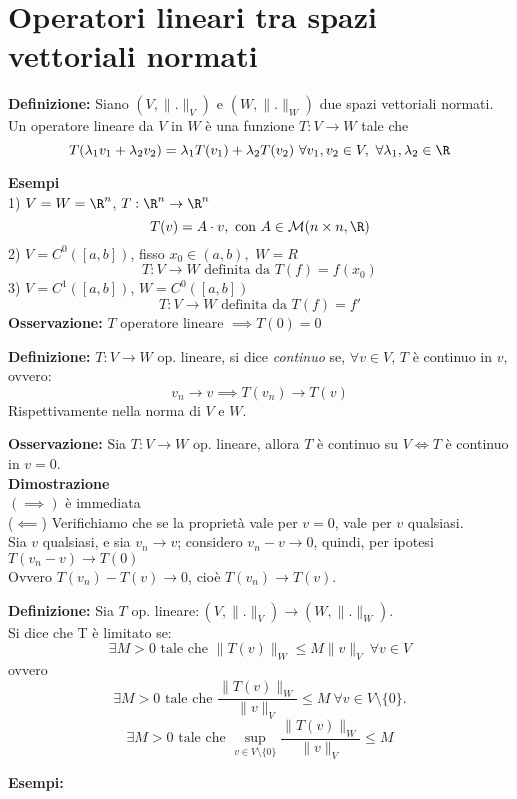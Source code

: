 

\section{Operatori lineari tra spazi vettoriali normati}
\begin{tcolorbox}
\textbf{Definizione: }Siano $(V,\|.\|_V)$ e $(W,\|.\|_W)$ due spazi vettoriali normati.
\\Un operatore lineare da $V$ in $W$ è una funzione  $T:V\to W$ tale che
\[T(\lambda_1v_1+\lambda_2v_2)=\lambda_1T(v_1)+\lambda_2T(v_2) \ \forall v_1,v_2\in V,\  \forall \lambda_1,\lambda_2\in \R\]
\end{tcolorbox}
\textbf{Esempi} 
\\1) $V=W=\R^n$, $T:\R^n\to \R^n$ 
\[T(v)=A\cdot v,\text{ con }A\in \mathcal M (n\times n,\R)\]
2) $V=C^0([a,b])$, fisso $x_0\in (a,b),$ $W=R$
\[T:V\to W\text{ definita da }T(f)=f(x_0)\]
3) $V=C^1([a,b])$, $W=C^0([a,b])$
\[T:V \to W\text{ definita da }T(f)=f'\]
\textbf{Osservazione:} $T$ operatore lineare $\implies T(0)=0$
\begin{tcolorbox}
\textbf{Definizione: } $T:V\to W$ op. lineare, si dice \emph{continuo} se, $\forall v\in V$, $T$ è continuo in $v$, ovvero:
\[v_n \to v\implies T(v_n)\to T(v)\]
Rispettivamente nella norma di $V$ e $W$.
\end{tcolorbox}
\textbf{Osservazione: }Sia $T:V\to W$ op. lineare, allora $T$ è continuo su $V\iff T$ è continuo in $v=0$.
\\\textbf{Dimostrazione} 
\\$(\implies)$ è immediata 
\\($\impliedby$) Verifichiamo che se la proprietà vale per $v=0$, vale per $v$ qualsiasi.
\\Sia $v$ qualsiasi, e sia $v_n\to v$; considero $v_n-v\to 0$, quindi, per ipotesi $T(v_n-v)\to T(0)$
\\Ovvero $T(v_n)- T(v)\to 0$, cioè $T(v_n)\to T(v)$.
\\\divider
\begin{tcolorbox}
	\textbf{Definizione: } Sia $T$ op. lineare$:(V,\|.\|_V)\to (W,\|.\|_W)$.
	\\Si dice che T è limitato se:
	\[\exists  M>0\text{ tale che }\|T(v)\|_W\le M\|v\|_V\ \forall v\in V\]
	ovvero
	\[\exists  M>0 \text{ tale che } \frac{\|T(v)\|_W}{\|v\|_V}\le M\ \forall v\in V\setminus\{0\}.\]
	\[\exists  M>0 \text{ tale che } \sup_{v\in V\setminus \{0\} }\frac{\|T(v)\|_W}{\|v\|_V}\le M\]
\end{tcolorbox}
\textbf{Esempi:} 
